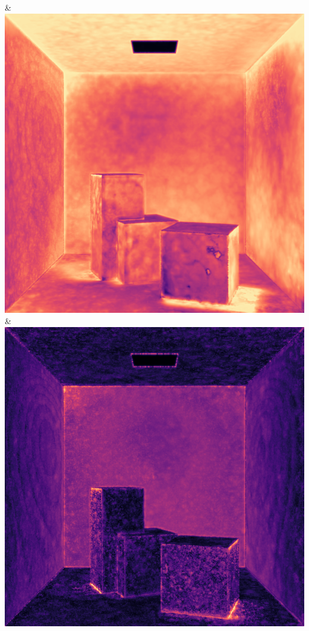 & \includegraphics[width=\linewidth]{figures/py/tests/quality_comparison/nrc+lt+bal_1spp_diffuse_flip.png}
& \includegraphics[width=\linewidth]{figures/py/tests/quality_comparison/nrc+sppc_1spp_diffuse_flip.png}
